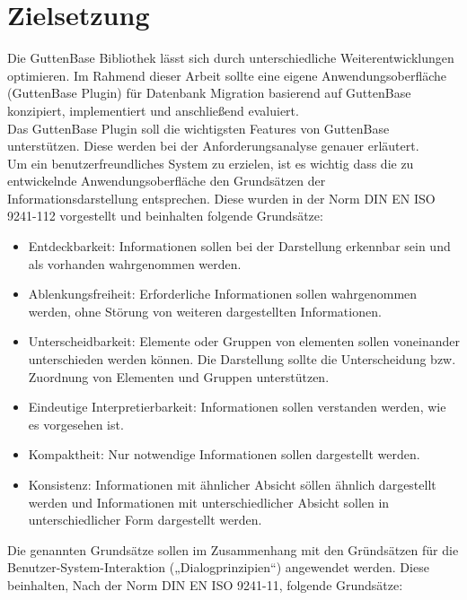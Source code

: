 \section{Zielsetzung}
Die GuttenBase Bibliothek lässt sich durch unterschiedliche Weiterentwicklungen optimieren. 
Im Rahmend dieser Arbeit sollte  eine eigene Anwendungsoberfläche (GuttenBase Plugin) für Datenbank Migration basierend auf GuttenBase konzipiert, implementiert und anschließend evaluiert. \\
Das GuttenBase Plugin soll die wichtigsten Features von GuttenBase unterstützen. Diese werden bei der Anforderungsanalyse genauer erläutert.\\
Um ein benutzerfreundliches System zu erzielen, ist es wichtig dass die zu entwickelnde Anwendungsoberfläche den Grundsätzen der Informationsdarstellung entsprechen. Diese wurden in der Norm DIN EN ISO 9241-112 vorgestellt und beinhalten folgende Grundsätze:
\begin{itemize}
	\item Entdeckbarkeit: 
	Informationen sollen bei der Darstellung erkennbar sein und als vorhanden wahrgenommen werden.
	
	\item Ablenkungsfreiheit: 
	Erforderliche Informationen sollen wahrgenommen werden, ohne Störung von weiteren dargestellten Informationen.
	
	\item Unterscheidbarkeit: 
	Elemente oder Gruppen von elementen sollen voneinander unterschieden werden können. Die Darstellung sollte die Unterscheidung bzw. Zuordnung von Elementen und Gruppen unterstützen.
	
	\item Eindeutige Interpretierbarkeit:
	Informationen sollen verstanden werden, wie es vorgesehen ist.
	
	\item Kompaktheit:
	Nur notwendige Informationen sollen dargestellt werden.
	
	\item Konsistenz:
	Informationen mit ähnlicher Absicht söllen ähnlich dargestellt werden und Informationen mit unterschiedlicher Absicht sollen in unterschiedlicher Form dargestellt werden.
	
\end{itemize}
Die genannten Grundsätze sollen im Zusammenhang mit den Gründsätzen für die Benutzer-System-Interaktion („Dialogprinzipien“) angewendet werden. Diese beinhalten, Nach der Norm DIN EN ISO 9241-11, folgende Grundsätze:
